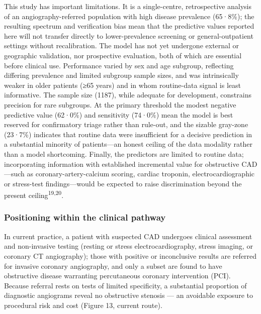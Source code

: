 \documentclass[
  english,
  11pt,
]{article}
\begin{document}
This study has important limitations. It is a single-centre,
retrospective analysis of an angiography-referred population with high
disease prevalence (65·8\%); the resulting spectrum and verification
bias mean that the predictive values reported here will not transfer
directly to lower-prevalence screening or general-outpatient settings
without recalibration. The model has not yet undergone external or
geographic validation, nor prospective evaluation, both of which are
essential before clinical use. Performance varied by sex and age
subgroup, reflecting differing prevalence and limited subgroup sample
sizes, and was intrinsically weaker in older patients (≥65 years) and
in whom routine-data signal is least informative. The sample size
(1187), while adequate for development, constrains precision for rare
subgroups. At the primary threshold the modest negative predictive value
(62·0\%) and sensitivity (74·0\%) mean the model is best reserved for
confirmatory triage rather than rule-out, and the sizable gray-zone
(23·7\%) indicates that routine data were insufficient for a decisive
prediction in a substantial minority of patients---an honest ceiling of
the data modality rather than a model shortcoming. Finally, the
predictors are limited to routine data; incorporating information with
established incremental value for obstructive CAD---such as
coronary-artery-calcium scoring, cardiac troponin, electrocardiographic
or stress-test findings---would be expected to raise discrimination
beyond the present ceiling\textsuperscript{19,20}.

\subsubsection{Positioning within the clinical
pathway}\label{positioning-within-the-clinical-pathway}

In current practice, a patient with suspected CAD undergoes clinical
assessment and non-invasive testing (resting or stress
electrocardiography, stress imaging, or coronary CT angiography); those
with positive or inconclusive results are referred for invasive coronary
angiography, and only a subset are found to have obstructive disease
warranting percutaneous coronary intervention (PCI). Because referral
rests on tests of limited specificity, a substantial proportion of
diagnostic angiograms reveal no obstructive stenosis --- an avoidable
exposure to procedural risk and cost (Figure 13, current route).
\end{document}
